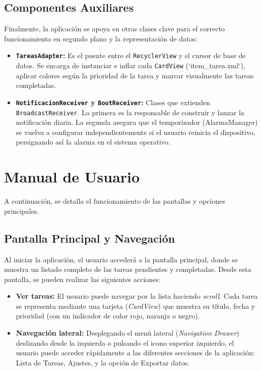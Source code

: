 \documentclass{article}
\begin{document}
\subsection{Componentes Auxiliares}

Finalmente, la aplicación se apoya en otras clases clave para el correcto funcionamiento en segundo plano y la representación de datos:

\begin{itemize}
    \item \textbf{\texttt{TareasAdapter}:} Es el puente entre el \texttt{RecyclerView} y el cursor de base de datos. Se encarga de instanciar e inflar cada \texttt{CardView} (`item\_tarea.xml`), aplicar colores según la prioridad de la tarea y marcar visualmente las tareas completadas.
    \item \textbf{\texttt{NotificacionReceiver} y \texttt{BootReceiver}:} Clases que extienden \texttt{Broadcast\allowbreak Receiver}. La primera es la responsable de construir y lanzar la notificación diaria. La segunda asegura que el temporizador (AlarmaManager) se vuelva a configurar independientemente si el usuario reinicia el dispositivo, persignando así la alarma en el sistema operativo.
\end{itemize}

\section{Manual de Usuario}

A continuación, se detalla el funcionamiento de las pantallas y opciones principales.

\subsection{Pantalla Principal y Navegación}

Al iniciar la aplicación, el usuario accederá a la pantalla principal, donde se muestra un listado completo de las tareas pendientes y completadas. Desde esta pantalla, se pueden realizar las siguientes acciones:

\begin{itemize}
    \item \textbf{Ver tareas:} El usuario puede navegar por la lista haciendo \textit{scroll}. Cada tarea se representa mediante una tarjeta (\textit{CardView}) que muestra su título, fecha y prioridad (con un indicador de color rojo, naranja o negro).
    \item \textbf{Navegación lateral:} Desplegando el menú lateral (\textit{Navigation Drawer}) deslizando desde la izquierda o pulsando el icono superior izquierdo, el usuario puede acceder rápidamente a las diferentes secciones de la aplicación: Lista de Tareas, Ajustes, y la opción de Exportar datos.
\end{itemize}
\end{document}
